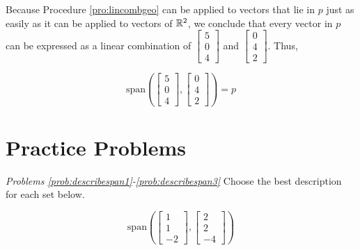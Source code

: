 \documentclass{ximera}
\begin{document}
\begin{example}
\begin{explanation}
Because Procedure \ref{pro:lincombgeo} can be applied to vectors that lie in $p$ just as easily as it can be applied to vectors of $\mathbb{R}^2$, we conclude that every vector in $p$ can be expressed as a linear combination of $\begin{bmatrix}5\\0\\4\end{bmatrix}$ and  $\begin{bmatrix}0\\4\\2\end{bmatrix}$.  Thus, 

$$\mbox{span}\left(\begin{bmatrix}5\\0\\4\end{bmatrix}, \begin{bmatrix}0\\4\\2\end{bmatrix}\right)=p$$

\end{explanation}
\end{example}

\section*{Practice Problems}

\emph{Problems \ref{prob:describespan1}-\ref{prob:describespan3}}
Choose the best description for each set below.

  \begin{problem}\label{prob:describespan1}
  $$\mbox{span}\left(\begin{bmatrix}1\\1\\-2\end{bmatrix}, \begin{bmatrix}2\\2\\-4\end{bmatrix}\right)$$
  
  \begin{multipleChoice}
 \end{multipleChoice}
  \end{problem}
  
\end{document}
